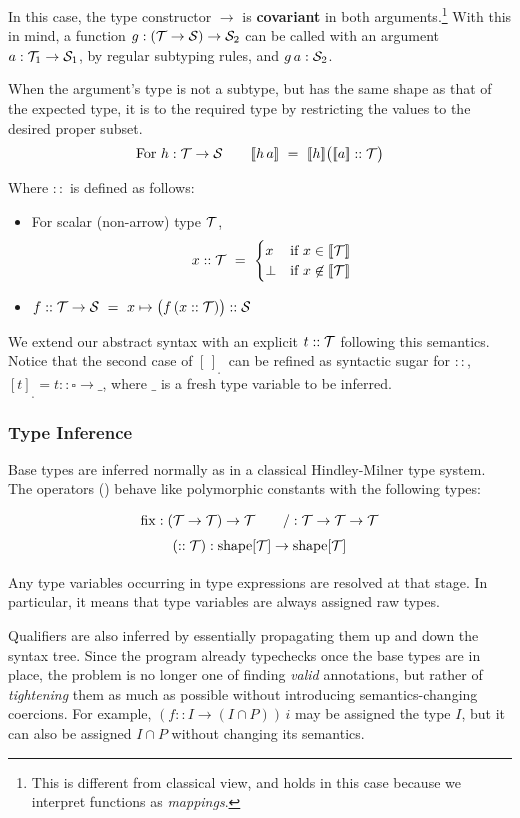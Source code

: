 In this case, the type constructor $\to$ is {\bf covariant} in both arguments.\footnote{This is different from classical view, and holds in this case because we interpret functions as \emph{mappings}.}
With this in mind, a function $g:(\T\to\S)\to \S_2$ can be called with an argument $a: \T_1\to\S_1$,
by regular subtyping rules, and $g\,a : \S_2$.

When the argument's type is not a subtype, but has the same shape as that of the expected type,
it is  to the required type by restricting the values to the desired proper subset.
%
\[\mbox{For }h:\T\to\S \qquad \semp{h\,a} ~=~ \semp{h}\big(\semp{a} :: \T\big)\]

Where $::$ is defined as follows:
\begin{itemize}
  \item For scalar (non-arrow) type $\T$, \[x :: \T ~=~ \begin{cases}x & \mbox{if }x\in\semp{\T} \\ \bot & \mbox{if }x\not\in\semp{\T}\end{cases}\]
  \item $f :: \T\to\S ~=~ x\mapsto \big(f\,(x :: \T)\big) :: \S$
\end{itemize}

\medskip
We extend our abstract syntax with an explicit 
$t::\T$ following this semantics. Notice that the second case of $[\,]_{_\square}\,$
can be refined as syntactic sugar for $::$,
$[t]_{_\square} = t :: \square\to \_$, where $\_$ is a fresh
type variable to be inferred.

\subsubsection*{Type Inference}

Base types are inferred normally as in a classical Hindley-Milner type system.
The operators () behave like polymorphic
constants with the following types:
\[\renewcommand\arraystretch{1.5}
  \begin{array}{c}
    {\fix} : (\T\to\T)\to\T \qquad {/} : \T\to\T\to\T \\
    (::\T) : \mathrm{shape}[\T]\to\mathrm{shape}[\T]
  \end{array}\]

Any type variables occurring in type expressions are resolved at that
stage. In particular, it means that type variables are always assigned raw types.

Qualifiers are also inferred by essentially propagating them up and down the syntax tree.
Since the program already typechecks once the base types are in place, the problem is no longer
one of finding {\em valid} annotations, but rather of {\em tightening} them as much as possible
without introducing semantics-changing coercions. For example, $(f :: I\to(I\cap P))\,i$ may
be assigned the type $I$, but it can also be assigned $I\cap P$ without changing its semantics.

